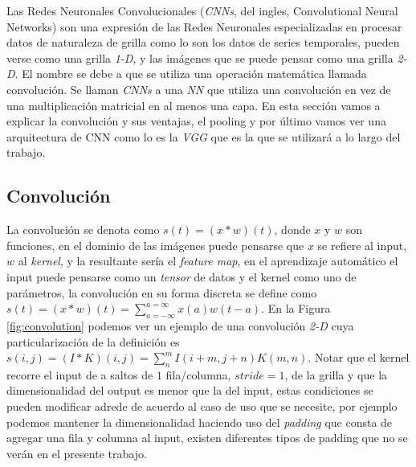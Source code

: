 Las Redes Neuronales Convolucionales (\textit{CNNs}, del ingles, Convolutional Neural Networks) son una expresión de las Redes Neuronales especializadas en procesar datos de naturaleza de grilla como lo son los datos de series temporales, pueden verse como una grilla \textit{1-D}, y las imágenes que se puede pensar como una grilla \textit{2-D}. El nombre se debe a que se utiliza una operación matemática llamada convolución. Se llaman \textit{CNNs} a una \textit{NN} que utiliza una convolución en vez de una multiplicación matricial en al menos una capa. En esta sección vamos a explicar la convolución y sus ventajas, el pooling y por último vamos ver una arquitectura de CNN como lo es la \textit{VGG} que es la que se utilizará a lo largo del trabajo.

\subsection{Convolución}

La convolución se denota como $s(t) = (x * w) (t)$, donde $x$ y $w$ son funciones, en el dominio de las imágenes puede pensarse que $x$ se refiere al input, $w$ al \textit{kernel}, y la resultante sería el \textit{feature map}, en el aprendizaje automático el input puede pensarse como un \textit{tensor} de datos y el kernel como uno de parámetros, la convolución en su forma discreta se define como $s(t) = (x * w) (t) = \sum_{a=-\infty}^{a=\infty} x(a) w(t - a)$. En la Figura \ref{fig:convolution} podemos ver un ejemplo de una convolución \textit{2-D} cuya particularización de la definición es $s(i, j) = (I * K) (i, j) = \sum_{n}^{m} I(i+m, j+n) K(m, n)$. Notar que el kernel recorre el input de a saltos de $1$ fila/columna, $stride = 1$, de la grilla y que la dimensionalidad del output es menor que la del input, estas condiciones se pueden modificar adrede de acuerdo al caso de uso que se necesite, por ejemplo podemos mantener la dimensionalidad haciendo uso del \textit{padding} que consta de agregar una fila y columna al input, existen diferentes tipos de padding que no se verán en el presente trabajo.

